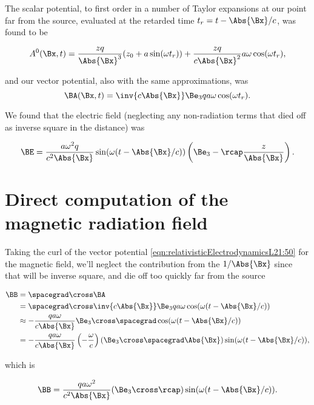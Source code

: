 The scalar potential, to first order in a number of Taylor expansions at our point far from the source, evaluated at the retarded time $t_r = t - \Abs{\Bx}/c$, was found to be

\begin{equation}\label{eqn:relativisticElectrodynamicsL21:35}
A^0(\Bx, t) = \frac{z q}{\Abs{\Bx}^3} ( z_0 + a \sin(\omega t_r) ) + \frac{z q}{c \Abs{\Bx}^2} a \omega \cos(\omega t_r),
\end{equation}

and our vector potential, also with the same approximations, was
\begin{equation}\label{eqn:relativisticElectrodynamicsL21:40}
\BA(\Bx, t) = \inv{c \Abs{\Bx} } \Be_3 q a \omega \cos(\omega t_r).
\end{equation}

We found that the electric field (neglecting any non-radiation terms that died off as inverse square in the distance) was

\begin{equation}\label{eqn:relativisticElectrodynamicsL21:50}
\BE = \frac{a \omega^2 q}{c^2 \Abs{\Bx}} \sin( \omega (t - \Abs{\Bx}/c) ) \left( \Be_3 - \rcap \frac{z}{\Abs{\Bx}} \right).
\end{equation}

\section{Direct computation of the magnetic radiation field}

Taking the curl of the vector potential \ref{eqn:relativisticElectrodynamicsL21:50} for the magnetic field, we'll neglect the contribution from the $1/\Abs{\Bx}$ since that will be inverse square, and die off too quickly far from the source

\begin{align*}
\BB
&= \spacegrad \cross \BA \\
&= \spacegrad \cross \inv{c \Abs{\Bx} } \Be_3 q a \omega \cos(\omega (t - \Abs{\Bx}/c)) \\
&\approx - \frac{q a \omega}{c \Abs{\Bx} } \Be_3 \cross \spacegrad \cos(\omega (t - \Abs{\Bx}/c)) \\
&= - \frac{q a \omega}{c \Abs{\Bx} } \left( -\frac{\omega}{c} \right)
(\Be_3 \cross \spacegrad \Abs{\Bx}) \sin(\omega (t - \Abs{\Bx}/c)),
\end{align*}

which is

\begin{equation}\label{eqn:relativisticElectrodynamicsL21:60}
\BB = \frac{q a \omega^2}{c^2 \Abs{\Bx} } (\Be_3 \cross \rcap) \sin(\omega (t - \Abs{\Bx}/c)).
\end{equation}

